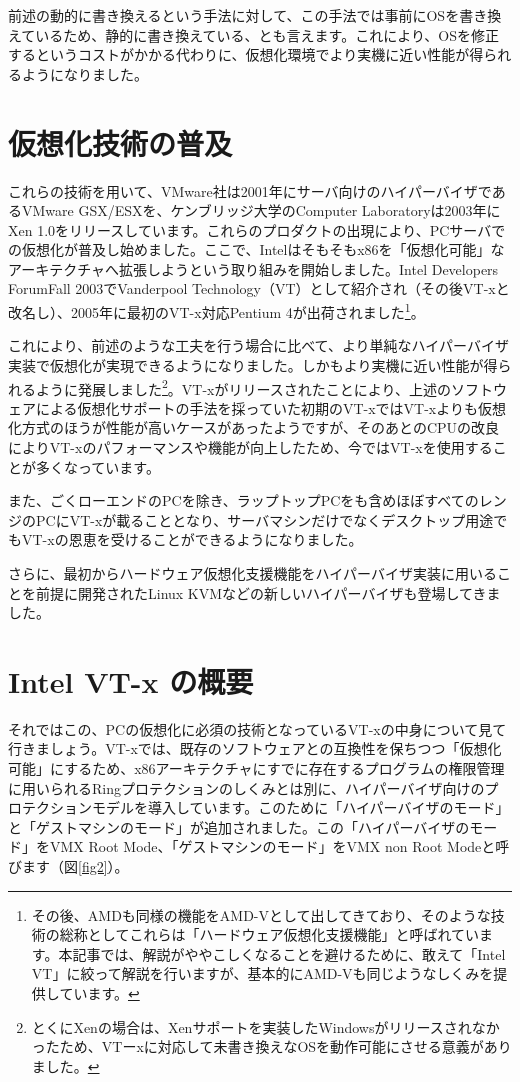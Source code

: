 前述の動的に書き換えるという手法に対して、この手法では事前にOSを書き換えているため、静的に書き換えている、とも言えます。これにより、OSを修正するというコストがかかる代わりに、仮想化環境でより実機に近い性能が得られるようになりました。

\section{仮想化技術の普及}
これらの技術を用いて、VMware社は2001年にサーバ向けのハイパーバイザであるVMware GSX/ESXを、ケンブリッジ大学のComputer Laboratoryは2003年にXen 1.0をリリースしています。これらのプロダクトの出現により、PCサーバでの仮想化が普及し始めました。ここで、Intelはそもそもx86を「仮想化可能」なアーキテクチャへ拡張しようという取り組みを開始しました。Intel Developers ForumFall 2003でVanderpool Technology（VT）として紹介され（その後VT-xと改名し）、2005年に最初のVT-x対応Pentium 4が出荷されました\footnote{その後、AMDも同様の機能をAMD-Vとして出してきており、そのような技術の総称としてこれらは「ハードウェア仮想化支援機能」と呼ばれています。本記事では、解説がややこしくなることを避けるために、敢えて「Intel VT」に絞って解説を行いますが、基本的にAMD-Vも同じようなしくみを提供しています。}。

これにより、前述のような工夫を行う場合に比べて、より単純なハイパーバイザ実装で仮想化が実現できるようになりました。しかもより実機に近い性能が得られるように発展しました\footnote{とくにXenの場合は、Xenサポートを実装したWindowsがリリースされなかったため、VTーxに対応して未書き換えなOSを動作可能にさせる意義がありました。}。VT-xがリリースされたことにより、上述のソフトウェアによる仮想化サポートの手法を採っていた初期のVT-xではVT-xよりも仮想化方式のほうが性能が高いケースがあったようですが、そのあとのCPUの改良によりVT-xのパフォーマンスや機能が向上したため、今ではVT-xを使用することが多くなっています。

また、ごくローエンドのPCを除き、ラップトップPCをも含めほぼすべてのレンジのPCにVT-xが載ることとなり、サーバマシンだけでなくデスクトップ用途でもVT-xの恩恵を受けることができるようになりました。

さらに、最初からハードウェア仮想化支援機能をハイパーバイザ実装に用いることを前提に開発されたLinux KVMなどの新しいハイパーバイザも登場してきました。

\section{Intel VT-x の概要}
それではこの、PCの仮想化に必須の技術となっているVT-xの中身について見て行きましょう。VT-xでは、既存のソフトウェアとの互換性を保ちつつ「仮想化可能」にするため、x86アーキテクチャにすでに存在するプログラムの権限管理に用いられるRingプロテクションのしくみとは別に、ハイパーバイザ向けのプロテクションモデルを導入しています。このために「ハイパーバイザのモード」と「ゲストマシンのモード」が追加されました。この「ハイパーバイザのモード」をVMX Root Mode、「ゲストマシンのモード」をVMX non Root Modeと呼びます（図\ref{fig2}）。

